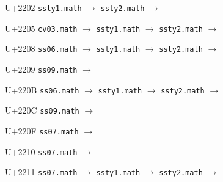\documentclass{article}
\begin{document}
\clearpage

\begin{substitutions}

U+2202  \linebreak
    \texttt{ssty1.math} $\to$  \linebreak
    \texttt{ssty2.math} $\to$  

\goodbreak

U+2205  \linebreak
    \texttt{cv03.math} $\to$  \linebreak
    \texttt{ssty1.math} $\to$  \linebreak
    \texttt{ssty2.math} $\to$  

\goodbreak

U+2208  \linebreak
    \texttt{ss06.math} $\to$  \linebreak
    \texttt{ssty1.math} $\to$  \linebreak
    \texttt{ssty2.math} $\to$  

\goodbreak

U+2209  \linebreak
    \texttt{ss09.math} $\to$  

\goodbreak

U+220B  \linebreak
    \texttt{ss06.math} $\to$  \linebreak
    \texttt{ssty1.math} $\to$  \linebreak
    \texttt{ssty2.math} $\to$  

\goodbreak

U+220C  \linebreak
    \texttt{ss09.math} $\to$  

\goodbreak

U+220F  \linebreak
    \texttt{ss07.math} $\to$  

\goodbreak

U+2210  \linebreak
    \texttt{ss07.math} $\to$  

\goodbreak

U+2211  \linebreak
    \texttt{ss07.math} $\to$  \linebreak
    \texttt{ssty1.math} $\to$  \linebreak
    \texttt{ssty2.math} $\to$  


\end{substitutions}
\end{document}
